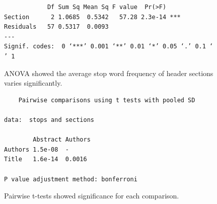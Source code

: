 \begin{figure}
\centering
\begin{BVerbatim}
            Df Sum Sq Mean Sq F value  Pr(>F)
Section      2 1.0685  0.5342   57.28 2.3e-14 ***
Residuals   57 0.5317  0.0093                    
---
Signif. codes:  0 ‘***’ 0.001 ‘**’ 0.01 ‘*’ 0.05 ‘.’ 0.1 ‘ ’ 1
\end{BVerbatim}
\caption{ANOVA showed the average stop word frequency of header sections varies significantly.}
\label{fig:anova}
\end{figure}

\begin{figure}
\centering
\begin{BVerbatim}
	Pairwise comparisons using t tests with pooled SD

data:  stops and sections

        Abstract Authors
Authors 1.5e-08  -      
Title   1.6e-14  0.0016

P value adjustment method: bonferroni
\end{BVerbatim}
\caption{Pairwise t-tests showed significance for each comparison.}
\label{fig:ttest}
\end{figure}
